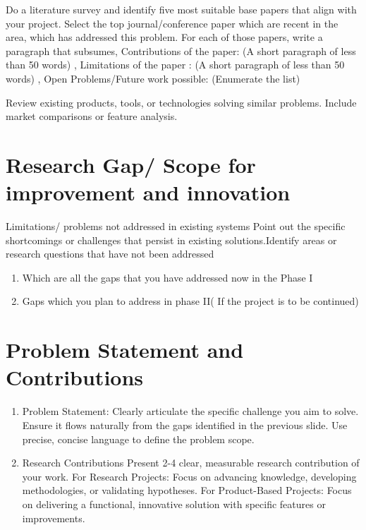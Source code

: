 Do a literature survey and identify five most suitable base papers that align with your project. Select the top journal/conference paper which are recent in the area, which has addressed this problem. For each of those papers, write a
paragraph that subsumes, Contributions of the paper: (A short paragraph of less than 50 words) , Limitations of the paper : (A short paragraph of less than 50 words) , Open Problems/Future work possible: (Enumerate the list) 

Review existing products, tools, or technologies solving similar problems.
Include market comparisons or feature analysis.

\section{Research Gap/ Scope for improvement and innovation}

Limitations/ problems not addressed in existing systems Point out the specific shortcomings or challenges that persist in existing solutions.Identify areas or research questions that have not been addressed
\begin{enumerate}
    \item Which are all the gaps that you have addressed now in the Phase I
    \item Gaps which you plan to address in phase II( If the project is to be continued)
\end{enumerate}


\section{Problem Statement and Contributions}

\begin{enumerate}
    \item Problem Statement: Clearly articulate the specific challenge you aim to solve. Ensure it flows naturally from the gaps identified in the previous slide. Use precise, concise language to define the problem scope.
    \item  Research Contributions Present 2-4 clear, measurable research contribution of your work. For Research Projects: Focus on advancing knowledge, developing methodologies, or validating hypotheses. For Product-Based Projects: Focus on delivering a functional, innovative solution with specific features or improvements.
\end{enumerate}